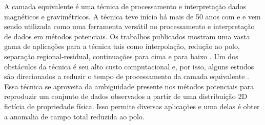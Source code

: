 A camada equivalente é uma técnica de processamento e interpretação dados magnéticos e gravimétricos. A técnica teve início há mais de 50 anos com \cite{dampney_equivalent_1969} e \cite{emilia_equivalent_1973} e vem sendo utilizada como uma ferramenta versátil no processamento e interpretação de dados em métodos potenciais. Os trabalhos publicados mostram uma vasta gama de aplicações para a técnica tais como interpolação, redução ao polo, separação regional-residual, continuações para cima e para baixo \cite[por exemplo, ][]{mendonca1992,mendonca-silva1995,mendonca2004,macLennan-li2013,silva1986,li-li2014,hansen-miyazaki1984}. Um dos obstáculos da técnica é seu alto custo computacional e, por isso, alguns estudos são direcionados a reduzir o tempo de processamento da camada equivalente \cite[por exemplo ,][]{leao-silva1989,mendonca-silva1994,siqueira-etal2017,oliveirajr-etal2013, takahashi-2020,mendonca-2020,reis_etal2020}.
Essa técnica se aproveita da ambiguidade presente nos métodos potenciais para reproduzir um conjunto de dados observados a partir de uma distribuição 2D fictícia de propriedade física.
Isso permite diversas aplicações e uma delas é obter a  anomalia de campo total reduzida ao polo.